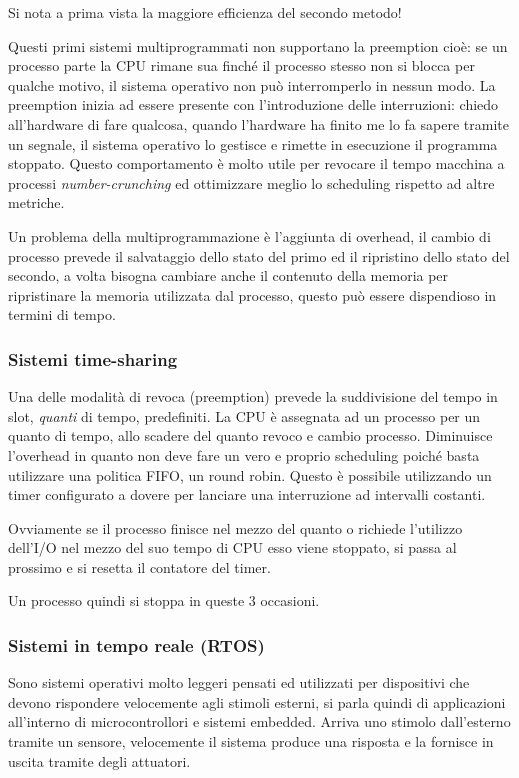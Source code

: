 Si nota a prima vista la maggiore efficienza del secondo metodo!

Questi primi sistemi multiprogrammati non supportano la preemption cioè: se un processo parte la CPU rimane sua finché il processo stesso non si blocca per qualche motivo, il sistema operativo non può interromperlo in nessun modo.
La preemption inizia ad essere presente con l'introduzione delle interruzioni: chiedo all'hardware di fare qualcosa, quando l'hardware ha finito me lo fa sapere tramite un segnale, il sistema operativo lo gestisce e rimette in esecuzione il programma stoppato.
Questo comportamento è molto utile per revocare il tempo macchina a processi \emph{number-crunching} ed ottimizzare meglio lo scheduling rispetto ad altre metriche.

Un problema della multiprogrammazione è l'aggiunta di overhead, il cambio di processo prevede il salvataggio dello stato del primo ed il ripristino dello stato del secondo, a volta bisogna cambiare anche il contenuto della memoria per ripristinare la memoria utilizzata dal processo, questo può essere dispendioso in termini di tempo.

\subsubsection{Sistemi time-sharing}
Una delle modalità di revoca (preemption) prevede la suddivisione del tempo in slot, \emph{quanti} di tempo, predefiniti.
La CPU è assegnata ad un processo per un quanto di tempo, allo scadere del quanto revoco e cambio processo.
Diminuisce l'overhead in quanto non deve fare un vero e proprio scheduling poiché basta utilizzare una politica FIFO, un round robin.
Questo è possibile utilizzando un timer configurato a dovere per lanciare una interruzione ad intervalli costanti.

Ovviamente se il processo finisce nel mezzo del quanto o richiede l'utilizzo dell'I/O nel mezzo del suo tempo di CPU esso viene stoppato, si passa al prossimo e si resetta il contatore del timer.

Un processo quindi si stoppa in queste 3 occasioni.

\subsubsection{Sistemi in tempo reale (RTOS)}
Sono sistemi operativi molto leggeri pensati ed utilizzati per dispositivi che devono rispondere velocemente agli stimoli esterni, si parla quindi di applicazioni all'interno di microcontrollori e sistemi embedded.
Arriva uno stimolo dall'esterno tramite un sensore, velocemente il sistema produce una risposta e la fornisce in uscita tramite degli attuatori.

